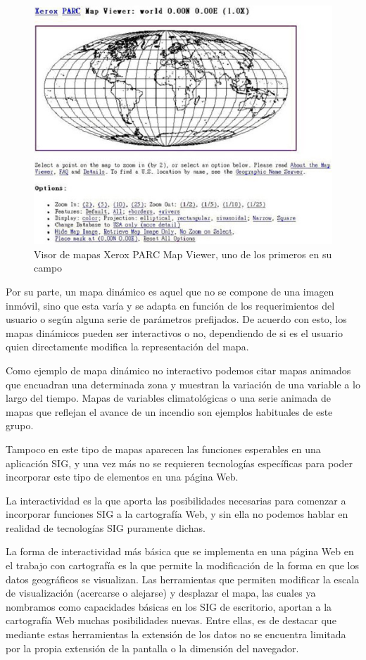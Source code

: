 \begin{figure}[!hbt]   
\centering
\includegraphics[width=.85\mycolumnwidth]{Cliente_servidor/XeroxPARC.png}
\caption{\small Visor de mapas Xerox PARC Map Viewer, uno de los primeros en su campo}
\label{Fig:XeroxPARC} 
\end{figure}


Por su parte, un mapa dinámico es aquel que no se compone de una imagen inmóvil, sino que esta varía y se adapta en función de los requerimientos del usuario o según alguna serie de parámetros prefijados. De acuerdo con esto, los mapas dinámicos pueden ser interactivos o no, dependiendo de si es el usuario quien directamente modifica la representación del mapa.

Como ejemplo de mapa dinámico no interactivo podemos citar mapas animados que encuadran una determinada zona y muestran la variación de una variable a lo largo del tiempo. Mapas de variables climatológicas o una serie animada de mapas que reflejan el avance de un incendio son ejemplos habituales de este grupo.

Tampoco en este tipo de mapas aparecen las funciones esperables en una aplicación SIG, y una vez más no se requieren tecnologías específicas para poder incorporar este tipo de elementos en una página Web.

La interactividad es la que aporta las posibilidades necesarias para comenzar a incorporar funciones SIG a la cartografía Web, y sin ella no podemos hablar en realidad de tecnologías SIG puramente dichas.

La forma de interactividad más básica que se implementa en una página Web en el trabajo con cartografía es la que permite la modificación de la forma en que los datos geográficos se visualizan. Las herramientas que permiten modificar la escala de visualización (acercarse o alejarse) y desplazar el mapa, las cuales ya nombramos como capacidades básicas en los SIG de escritorio, aportan a la cartografía Web muchas posibilidades nuevas. Entre ellas, es de destacar que mediante estas herramientas la extensión de los datos no se encuentra limitada por la propia extensión de la pantalla o la dimensión del navegador. 

